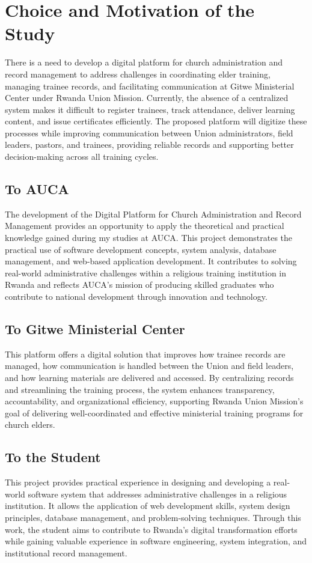 \documentclass[12pt]{report}
\begin{document}
\section{Choice and Motivation of the Study}
There is a need to develop a digital platform for church administration and record management to address challenges in coordinating elder training, managing trainee records, and facilitating communication at Gitwe Ministerial Center under Rwanda Union Mission. Currently, the absence of a centralized system makes it difficult to register trainees, track attendance, deliver learning content, and issue certificates efficiently. The proposed platform will digitize these processes while improving communication between Union administrators, field leaders, pastors, and trainees, providing reliable records and supporting better decision-making across all training cycles.

\subsection*{To AUCA}
The development of the Digital Platform for Church Administration and Record Management provides an opportunity to apply the theoretical and practical knowledge gained during my studies at AUCA. This project demonstrates the practical use of software development concepts, system analysis, database management, and web-based application development. It contributes to solving real-world administrative challenges within a religious training institution in Rwanda and reflects AUCA's mission of producing skilled graduates who contribute to national development through innovation and technology.

\subsection*{To Gitwe Ministerial Center}
This platform offers a digital solution that improves how trainee records are managed, how communication is handled between the Union and field leaders, and how learning materials are delivered and accessed. By centralizing records and streamlining the training process, the system enhances transparency, accountability, and organizational efficiency, supporting Rwanda Union Mission's goal of delivering well-coordinated and effective ministerial training programs for church elders.

\subsection*{To the Student}
This project provides practical experience in designing and developing a real-world software system that addresses administrative challenges in a religious institution. It allows the application of web development skills, system design principles, database management, and problem-solving techniques. Through this work, the student aims to contribute to Rwanda's digital transformation efforts while gaining valuable experience in software engineering, system integration, and institutional record management.
\end{document}
